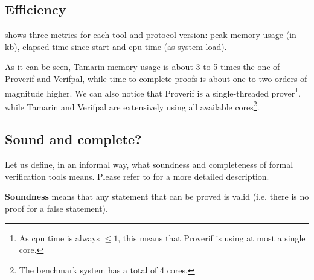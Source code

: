 \begin{table}[!ht]
\renewcommand{\arraystretch}{1.5}
\setlength\arrayrulewidth{1pt}
\caption{Expressiveness of tools.}
\label{tbl:expressiveness}
\end{table}

\subsection{Efficiency}
 shows three metrics for each tool and protocol version: peak memory usage (in kb), elapsed time since start and cpu time (as system load). 

As it can be seen, Tamarin memory usage is about 3 to 5 times the one of Proverif and Verifpal, while time to complete proofs is about one to two orders of magnitude higher. We can also notice that Proverif is a single-threaded prover\footnote{As cpu time is always $\leq 1$, this means that Proverif is using at most a single core.}, while Tamarin and Verifpal are extensively using all available cores\footnote{The benchmark system has a total of 4 cores.}.




\newpage
\subsection{Sound and complete?}

Let us define, in an informal way, what soundness and completeness of formal verification tools means. Please refer to \cite{Furer89oncompleteness} for a more detailed description.

\textbf{Soundness} means that any statement that can be proved is valid (i.e. there is no proof for a false statement).


